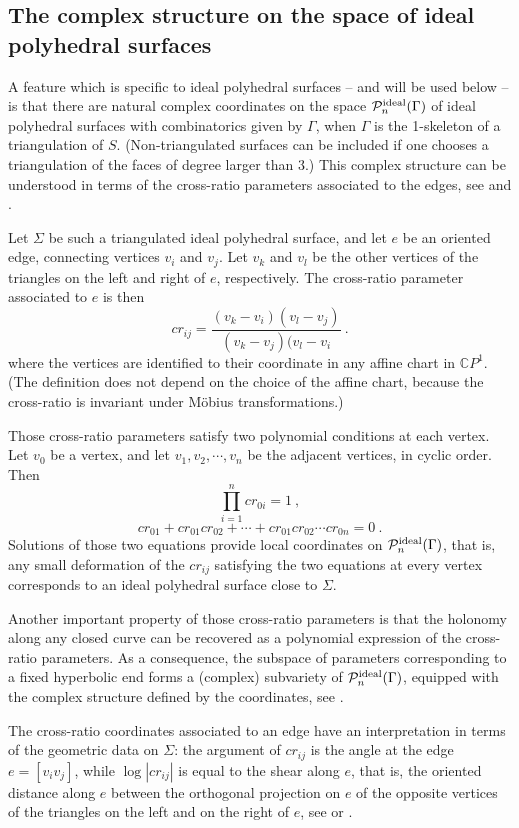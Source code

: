 \documentclass[notitlepage,twoside,a4paper]{amsart}
\newcommand{\Pidn}{\cP^{\rm ideal}_{n}}
\theoremstyle{named}
\newcommand{\CP}{{\mathbb CP}}
\newcommand{\cP}{{\mathcal P}}
\newcounter{notes}%
\begin{document}
\subsection{The complex structure on the space of ideal polyhedral surfaces}
\label{ssc:complex-ideal}

A feature which is specific to ideal polyhedral surfaces -- and will be used below -- is that there are natural complex coordinates on the space $\Pidn(\Gamma)$ of ideal polyhedral surfaces with combinatorics given by $\Gamma$, when $\Gamma$ is the 1-skeleton of a triangulation of $S$. (Non-triangulated surfaces can be included if one chooses a triangulation of the faces of degree larger than $3$.) This complex structure can be understood in terms of the cross-ratio parameters associated to the edges, see \cite[Section 4.1]{thurston-notes} and \cite[Def 1.1]{lam2019quadratic}.

Let $\Sigma$ be such a triangulated ideal polyhedral surface, and let $e$ be an oriented edge, connecting vertices $v_i$ and $v_j$. Let $v_k$ and $v_l$ be the other vertices of the triangles on the left and right of $e$, respectively. The cross-ratio parameter associated to $e$ is then
$$ cr_{ij} = \frac{(v_k-v_i)(v_l-v_j)}{(v_k-v_j)(v_l-v_i}~. $$
where the vertices are identified to their coordinate in any affine chart in $\CP^1$. (The definition does not depend on the choice of the affine chart, because the cross-ratio is invariant under M\"obius transformations.)

Those cross-ratio parameters satisfy two polynomial conditions at each vertex. Let $v_0$ be a vertex, and let $v_1, v_2,\cdots, v_n$ be the adjacent vertices, in cyclic order. Then
$$ \prod_{i=1}^n cr_{0i}=1~, $$
$$ cr_{01} + cr_{01}cr_{02} + \cdots + cr_{01}cr_{02}\cdots cr_{0n}=0~. $$
Solutions of those two equations provide local coordinates on $\Pidn(\Gamma)$, that is, any small deformation of the $cr_{ij}$ satisfying the two equations at every vertex corresponds to an ideal polyhedral surface close to $\Sigma$.

Another important property of those cross-ratio parameters is that the holonomy along any closed curve can be recovered as a polynomial expression of the cross-ratio parameters. As a consequence, the subspace of parameters corresponding to a fixed hyperbolic end forms a (complex) subvariety of $\Pidn(\Gamma)$, equipped with the complex structure defined by the coordinates, see \cite{lam2019quadratic}.

The cross-ratio coordinates associated to an edge have an interpretation in terms of the geometric data on $\Sigma$: the argument of $cr_{ij}$ is the angle at the edge $e=[v_iv_j]$, while $\log|cr_{ij}|$ is equal to the shear along $e$, that is, the oriented distance along $e$ between the orthogonal projection on $e$ of the opposite vertices of the triangles on the left and on the right of $e$, see \cite[Section 4.1]{thurston-notes} or \cite[Section 6.1]{lam2019quadratic}.
\end{document}
